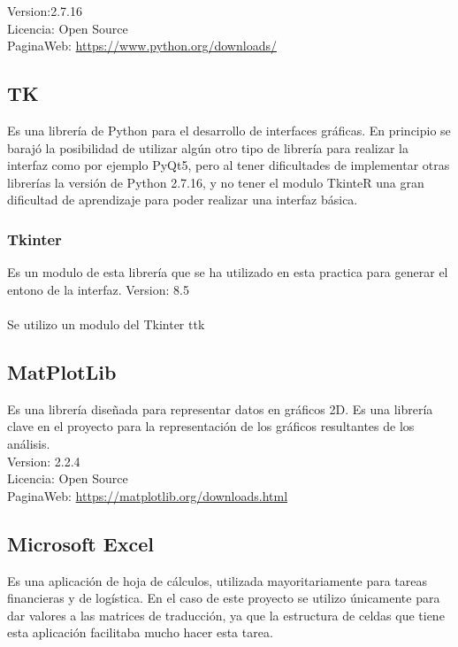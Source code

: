 Version:2.7.16\\
Licencia: Open Source\\
PaginaWeb: \url{https://www.python.org/downloads/}\\

\subsection{TK}

Es una librería de Python para el desarrollo de interfaces gráficas. En principio se barajó la posibilidad de utilizar algún otro tipo de librería para realizar la interfaz como por ejemplo PyQt5, pero al tener dificultades de implementar otras librerías la versión de Python 2.7.16, y no tener el modulo TkinteR una gran dificultad de aprendizaje para poder realizar una interfaz básica.



\subsubsection{Tkinter}
Es un modulo de esta librería que se ha utilizado en esta practica para generar el entono de la interfaz.
Version: 8.5 \\
\\



Se utilizo un modulo del Tkinter ttk

\subsection{MatPlotLib}

Es una librería diseñada para representar datos en gráficos 2D. Es una librería clave en el proyecto para la representación de los gráficos resultantes de los análisis.\\

Version: 2.2.4\\
Licencia: Open Source\\
PaginaWeb: \url{https://matplotlib.org/downloads.html}\\


\subsection{Microsoft Excel}
Es una aplicación de hoja de cálculos, utilizada mayoritariamente para tareas financieras y de logística. En el caso de este proyecto se utilizo únicamente para dar valores a las matrices de traducción, ya que la estructura de celdas que tiene esta aplicación facilitaba mucho hacer esta tarea.\\

